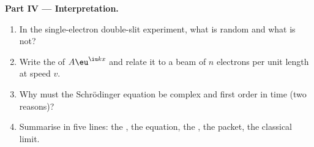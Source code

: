 \begin{problem}
\textbf{Part IV --- Interpretation.}
\begin{enumerate}[resume]
  \item In the single-electron double-slit experiment, what is random
        and what is not?
  \item Write the  of $A\eu^{\iu kx}$ and relate it to
        a beam of $n$ electrons per unit length at speed $v$.
  \item Why must the Schrödinger equation be complex and first order
        in time (two reasons)?
  \item Summarise in five lines: the , the equation, the
        , the packet, the classical limit.
\end{enumerate}
\end{problem}
